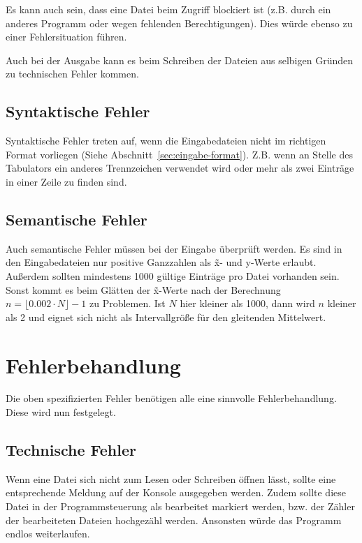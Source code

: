 Es kann auch sein, dass eine Datei beim Zugriff blockiert ist (z.B. durch ein anderes Programm oder wegen fehlenden Berechtigungen).
Dies würde ebenso zu einer Fehlersituation führen.

Auch bei der Ausgabe kann es beim Schreiben der Dateien aus selbigen Gründen zu technischen Fehler kommen.

\subsection{Syntaktische Fehler}\label{subsec:syntaktische-fehler}
Syntaktische Fehler treten auf, wenn die Eingabedateien nicht im richtigen Format vorliegen (Siehe Abschnitt~\ref{sec:eingabe-format}).
Z.B. wenn an Stelle des Tabulators ein anderes Trennzeichen verwendet wird oder mehr als zwei Einträge in einer Zeile zu finden sind.

\subsection{Semantische Fehler}\label{subsec:semantische-fehler}
Auch semantische Fehler müssen bei der Eingabe überprüft werden.
Es sind in den Eingabedateien nur positive Ganzzahlen als \~x- und y-Werte erlaubt.
Außerdem sollten mindestens 1000 gültige Einträge pro Datei vorhanden sein.
Sonst kommt es beim Glätten der \~x-Werte nach der Berechnung $n = \lfloor 0.002 \cdot N \rfloor - 1$ zu Problemen.
Ist $N$ hier kleiner als 1000, dann wird $n$ kleiner als 2 und eignet sich nicht als Intervallgröße für den gleitenden Mittelwert.

\section{Fehlerbehandlung}\label{sec:fehlerbehandlung}
Die oben spezifizierten Fehler benötigen alle eine sinnvolle Fehlerbehandlung.
Diese wird nun festgelegt.

\subsection{Technische Fehler}\label{subsec:technische-fehler-behandlung}
Wenn eine Datei sich nicht zum Lesen oder Schreiben öffnen lässt, sollte eine entsprechende Meldung auf der Konsole ausgegeben werden.
Zudem sollte diese Datei in der Programmsteuerung als bearbeitet markiert werden, bzw. der Zähler der bearbeiteten Dateien hochgezähl werden.
Ansonsten würde das Programm endlos weiterlaufen.

